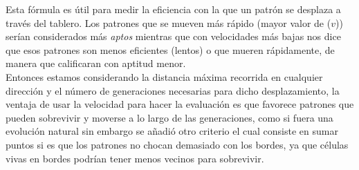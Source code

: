 Esta fórmula es útil para medir la eficiencia con la que un patrón se desplaza a través del 
tablero. Los patrones que se mueven más rápido (mayor valor de ($v$)) serían considerados 
más \textit{aptos} mientras que con velocidades más bajas nos dice que esos patrones son menos
eficientes (lentos) o que mueren rápidamente, de manera que calificaran con aptitud menor.\\    


Entonces estamos considerando la distancia máxima recorrida en cualquier dirección y el 
número de generaciones necesarias para dicho desplazamiento, la ventaja de usar la velocidad
para hacer la evaluación es que favorece patrones que pueden sobrevivir y moverse a lo largo de 
las generaciones, como si fuera una evolución natural sin embargo se añadió otro criterio el 
cual consiste en sumar puntos si es que los patrones no chocan demasiado con los bordes, ya que 
células vivas en bordes podrían tener menos vecinos para sobrevivir. 